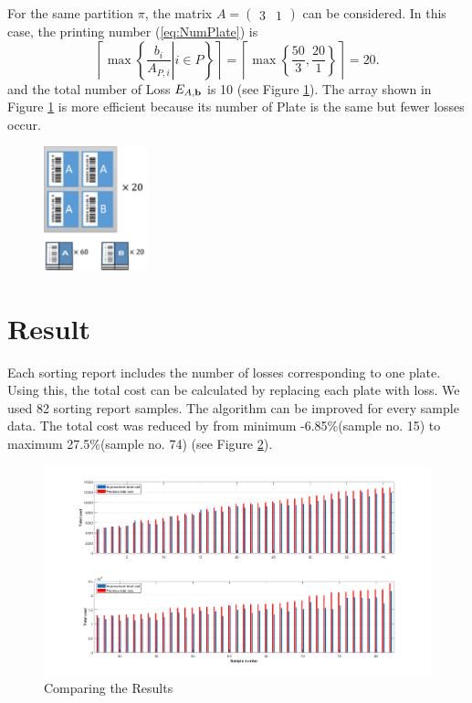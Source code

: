 \documentclass[review]{elsarticle}
\begin{document}
	For the same partition $\pi$, the matrix $A = (\begin{array}{cc}3 & 1\end{array})$ can be considered. In this case, the printing number (\ref{eq:NumPlate}) is 
	\begin{equation}
	\left\lceil \max\left\{ \left. \frac{b_{i}}{A_{P,i}} \right| i \in P \right\} \right\rceil = \left\lceil \max \left\{ \frac{50}{3}, \frac{20}{1} \right\} \right\rceil = 20.
	\end{equation}
	and the total number of Loss $E_{A,{\bf b}}$ is 10 (see Figure \ref{fig:ex22}).
	The array shown in Figure \ref{fig:ex22} is more efficient because its number of Plate is the same but fewer losses occur.
	\begin{figure}[h!]
		\centering
		\includegraphics[width=3cm]{ex22.pdf}
		\caption{}
		\label{fig:ex22}       %
	\end{figure}

\section{Result}\label{sec:Result}

Each sorting report includes the number of losses corresponding to one plate. 
Using this, the total cost can be calculated by replacing each plate with loss. 
We used 82 sorting report samples. The algorithm can be improved for every sample data.
The total cost was reduced by from minimum -6.85\%(sample no. 15) to maximum 27.5\%(sample no. 74) (see Figure \ref{fig:Comparing}).

\begin{figure}[h!]
	\centering
	\includegraphics[width=\linewidth]{Graph_2.png}
	\caption{Comparing the Results}
	\label{fig:Comparing}       %
\end{figure}
\end{document}
